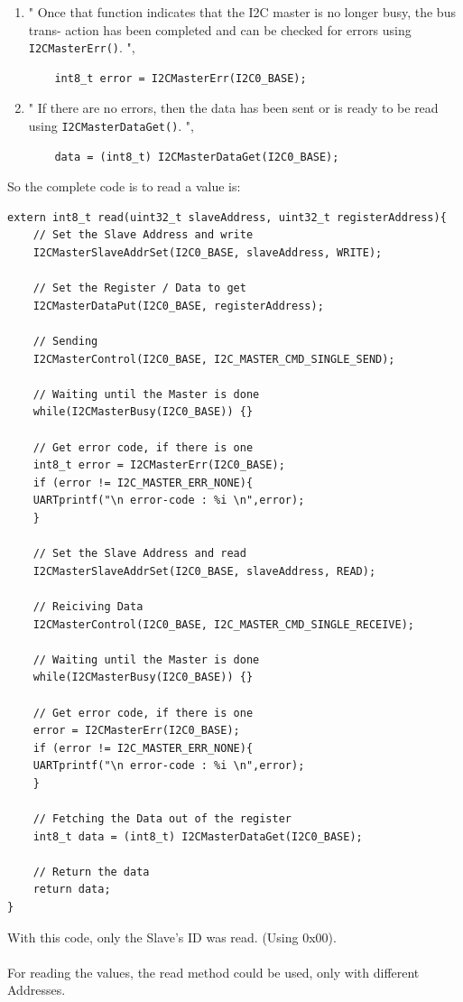 \documentclass[12pt]{article}
\begin{document}
\begin{enumerate}
  \item " Once that function indicates that the I2C master is no longer busy, the bus trans-
action has been completed and can be checked for errors using \texttt{I2CMasterErr()}. ",\cite[page 316]{UG} 
\begin{lstlisting}  
    int8_t error = I2CMasterErr(I2C0_BASE);
\end{lstlisting} 
                        
     \item " If there are no errors, then the data has been sent or is ready to be read using \texttt{I2CMasterDataGet()}. ",\cite[page 316]{UG} 
\begin{lstlisting}  
    data = (int8_t) I2CMasterDataGet(I2C0_BASE);
\end{lstlisting}    
     
\end{enumerate}
\newpage
  So the complete code is to read a value is:
\begin{lstlisting}    
extern int8_t read(uint32_t slaveAddress, uint32_t registerAddress){
    // Set the Slave Address and write
    I2CMasterSlaveAddrSet(I2C0_BASE, slaveAddress, WRITE);

    // Set the Register / Data to get
    I2CMasterDataPut(I2C0_BASE, registerAddress);

    // Sending
    I2CMasterControl(I2C0_BASE, I2C_MASTER_CMD_SINGLE_SEND); 

    // Waiting until the Master is done
    while(I2CMasterBusy(I2C0_BASE)) {} 

    // Get error code, if there is one
    int8_t error = I2CMasterErr(I2C0_BASE);
    if (error != I2C_MASTER_ERR_NONE){
	UARTprintf("\n error-code : %i \n",error);
    }

    // Set the Slave Address and read
    I2CMasterSlaveAddrSet(I2C0_BASE, slaveAddress, READ);

    // Reiciving Data
    I2CMasterControl(I2C0_BASE, I2C_MASTER_CMD_SINGLE_RECEIVE);

    // Waiting until the Master is done
    while(I2CMasterBusy(I2C0_BASE)) {}

    // Get error code, if there is one
    error = I2CMasterErr(I2C0_BASE);
    if (error != I2C_MASTER_ERR_NONE){
	UARTprintf("\n error-code : %i \n",error);
    }

    // Fetching the Data out of the register
    int8_t data = (int8_t) I2CMasterDataGet(I2C0_BASE);

    // Return the data
    return data;
}
\end{lstlisting}    
With this code, only the Slave's ID was read. (Using 0x00).
\\ \\
For reading the values, the read method could be used, only with different Addresses.
\newpage
\end{document}
